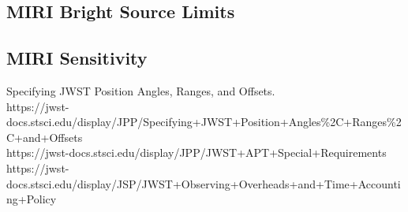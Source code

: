 \subsection{MIRI Bright Source Limits}
\subsection{MIRI Sensitivity}

\smallskip \smallskip
\noindent
Specifying JWST Position Angles, Ranges, and Offsets.\\
https://jwst-docs.stsci.edu/display/JPP/Specifying+JWST+Position+Angles\%2C+Ranges\%2C+and+Offsets\\
https://jwst-docs.stsci.edu/display/JPP/JWST+APT+Special+Requirements\\


https://jwst-docs.stsci.edu/display/JSP/JWST+Observing+Overheads+and+Time+Accounting+Policy





